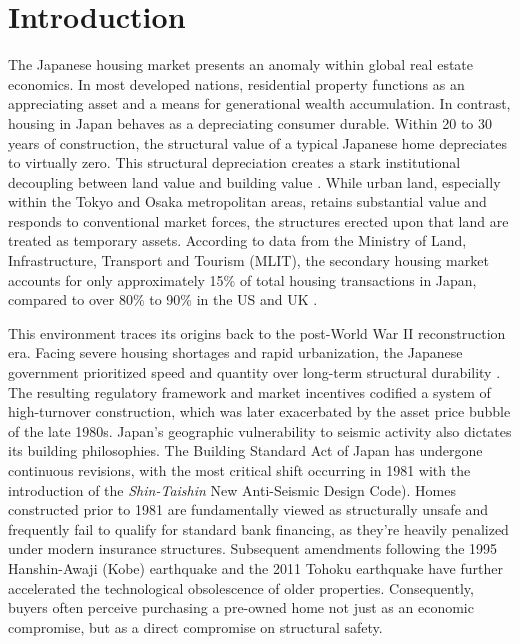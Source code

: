 \documentclass[12pt]{article}
\begin{document}
\section{Introduction}
The Japanese housing market presents an anomaly within global real estate economics. In most developed nations,
residential property functions as an appreciating asset and a means for generational wealth accumulation. In contrast,
housing in Japan behaves as a depreciating consumer durable. Within 20 to 30 years of construction, the structural value
of a typical Japanese home depreciates to virtually zero. This structural depreciation creates a stark institutional
decoupling between land value and building value \cite{yoshida2016structure}. While urban land, especially within the
Tokyo and Osaka metropolitan areas, retains substantial value and responds to conventional market forces, the structures
erected upon that land are treated as temporary assets. According to data from the Ministry of Land, Infrastructure,
Transport and Tourism (MLIT), the secondary housing market accounts for only approximately 15\% of total housing
transactions in Japan, compared to over 80\% to 90\% in the US and UK \cite{mlit2019revitalization}.

This environment traces its origins back to the post-World War II reconstruction era. Facing severe housing shortages
and rapid urbanization, the Japanese government prioritized speed and quantity over long-term structural durability
\cite{hirayama2006housing}. The resulting regulatory framework and market incentives codified a system of high-turnover
construction, which was later exacerbated by the asset price bubble of the late 1980s. Japan’s geographic vulnerability
to seismic activity also dictates its building philosophies. The Building Standard Act of Japan has undergone continuous
revisions, with the most critical shift occurring in 1981 with the introduction of the \textit{Shin-Taishin} New
Anti-Seismic Design Code). Homes constructed prior to 1981 are fundamentally viewed as structurally unsafe and
frequently fail to qualify for standard bank financing, as they're heavily penalized under modern insurance structures.
Subsequent amendments following the 1995 Hanshin-Awaji (Kobe) earthquake and the 2011 Tohoku earthquake have further
accelerated the technological obsolescence of older properties. Consequently, buyers often perceive purchasing a
pre-owned home not just as an economic compromise, but as a direct compromise on structural safety.
\end{document}
